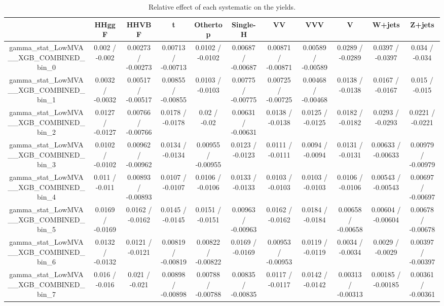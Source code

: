 \documentclass[10pt]{article}
\begin{document}
\begin{table}[htbp]
\begin{center}
\begin{tabular}{|c|c|c|c|c|c|c|c|c|c|c|}
\hline 
      & HHggF      & HHVBF      & t      & Othertop      & Single-H      & VV      & VVV      & V      & W+jets      & Z+jets \\ 
\hline 
  gamma_stat_LowMVA__XGB_COMBINED_bin_0 & 0.002 / -0.002 & 0.00273 / -0.00273 & 0.00713 / -0.00713 & 0.0102 / -0.0102 & 0.00687 / -0.00687 & 0.00871 / -0.00871 & 0.00589 / -0.00589 & 0.0289 / -0.0289 & 0.0397 / -0.0397 & 0.034 / -0.034 \\ 
  gamma_stat_LowMVA__XGB_COMBINED_bin_1 & 0.0032 / -0.0032 & 0.00517 / -0.00517 & 0.00855 / -0.00855 & 0.0103 / -0.0103 & 0.00775 / -0.00775 & 0.00725 / -0.00725 & 0.00468 / -0.00468 & 0.0138 / -0.0138 & 0.0167 / -0.0167 & 0.015 / -0.015 \\ 
  gamma_stat_LowMVA__XGB_COMBINED_bin_2 & 0.0127 / -0.0127 & 0.00766 / -0.00766 & 0.0178 / -0.0178 & 0.02 / -0.02 & 0.00631 / -0.00631 & 0.0138 / -0.0138 & 0.0125 / -0.0125 & 0.0182 / -0.0182 & 0.0293 / -0.0293 & 0.0221 / -0.0221 \\ 
  gamma_stat_LowMVA__XGB_COMBINED_bin_3 & 0.0102 / -0.0102 & 0.00962 / -0.00962 & 0.0134 / -0.0134 & 0.00955 / -0.00955 & 0.0123 / -0.0123 & 0.0111 / -0.0111 & 0.0094 / -0.0094 & 0.0131 / -0.0131 & 0.00633 / -0.00633 & 0.00979 / -0.00979 \\ 
  gamma_stat_LowMVA__XGB_COMBINED_bin_4 & 0.011 / -0.011 & 0.00893 / -0.00893 & 0.0107 / -0.0107 & 0.0106 / -0.0106 & 0.0133 / -0.0133 & 0.0103 / -0.0103 & 0.0103 / -0.0103 & 0.0106 / -0.0106 & 0.00543 / -0.00543 & 0.00697 / -0.00697 \\ 
  gamma_stat_LowMVA__XGB_COMBINED_bin_5 & 0.0169 / -0.0169 & 0.0162 / -0.0162 & 0.0145 / -0.0145 & 0.0151 / -0.0151 & 0.00963 / -0.00963 & 0.0162 / -0.0162 & 0.0184 / -0.0184 & 0.00658 / -0.00658 & 0.00604 / -0.00604 & 0.00678 / -0.00678 \\ 
  gamma_stat_LowMVA__XGB_COMBINED_bin_6 & 0.0132 / -0.0132 & 0.0121 / -0.0121 & 0.00819 / -0.00819 & 0.00822 / -0.00822 & 0.0169 / -0.0169 & 0.00953 / -0.00953 & 0.0119 / -0.0119 & 0.0034 / -0.0034 & 0.0029 / -0.0029 & 0.00397 / -0.00397 \\ 
  gamma_stat_LowMVA__XGB_COMBINED_bin_7 & 0.016 / -0.016 & 0.021 / -0.021 & 0.00898 / -0.00898 & 0.00788 / -0.00788 & 0.00835 / -0.00835 & 0.0117 / -0.0117 & 0.0142 / -0.0142 & 0.00313 / -0.00313 & 0.00185 / -0.00185 & 0.00361 / -0.00361 \\ 
\hline 
\end{tabular} 
\caption{Relative effect of each systematic on the yields.} 
\end{center} 
\end{table} 
\end{document}
